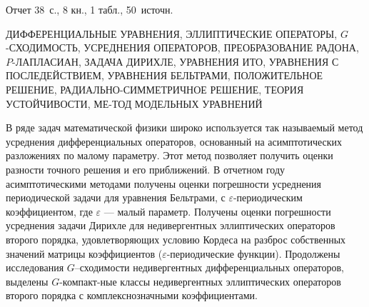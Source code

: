 \Referat %

Отчет 38~с., 8 кн., 1 табл., 50~источн.

ДИФФЕРЕНЦИАЛЬНЫЕ УРАВНЕНИЯ,
ЭЛЛИПТИЧЕСКИЕ ОПЕРАТОРЫ,
$G$-СХОДИМОСТЬ, %
УСРЕДНЕНИЯ ОПЕРАТОРОВ,
ПРЕОБРАЗОВАНИЕ РАДОНА,
$P$-ЛАПЛАСИАН,
ЗАДАЧА ДИРИХЛЕ,
УРАВНЕНИЯ ИТО,
УРАВНЕНИЯ С ПОСЛЕДЕЙСТВИЕМ,
УРАВНЕНИЯ БЕЛЬТРАМИ,
ПОЛОЖИТЕЛЬНОЕ РЕШЕНИЕ,
РАДИАЛЬНО-СИММЕТРИЧНОЕ РЕШЕНИЕ,
ТЕОРИЯ УСТОЙЧИВОСТИ,
МЕ-\linebreak ТОД МОДЕЛЬНЫХ УРАВНЕНИЙ



В ряде задач математической физики широко используется так называемый метод усреднения дифференциальных операторов, основанный на асимптотических разложениях по малому параметру. Этот метод позволяет получить оценки разности точного решения и его приближений.
В отчетном году асимптотическими методами получены оценки погрешности усреднения периодической задачи для уравнения Бельтрами, с $\varepsilon$-периодическим коэффициентом, где $\varepsilon$  --- малый параметр.
Получены оценки погрешности усреднения задачи Дирихле для недивергентных эллиптических операторов второго порядка, удовлетворяющих условию Кордеса на разброс собственных значений матрицы коэффициентов ($\varepsilon$-периодические функции).
Продолжены исследования  $G$--сходимости недивергентных дифференциальных операторов, выделены $G$-компакт-\linebreak ные классы недивергентных эллиптических операторов второго порядка с комплекснозначными коэффициентами.








